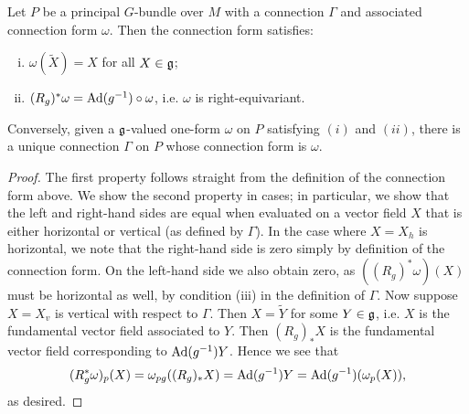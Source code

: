 \begin{thm}
Let $P$ be a principal $G$-bundle over $M$ with a connection $\Gamma$ and associated connection form $\omega$. Then the connection form satisfies:
\begin{enumerate}[(i)]
\item $\omega(\tilde X)=X$ for all $X\in\mathfrak g$;
\item $(R_g)^*\omega=\operatorname{Ad}(g^{-1})\circ \omega$, i.e. $\omega$ is right-equivariant.
\end{enumerate}

Conversely, given a $\mathfrak g$-valued one-form $\omega$ on $P$ satisfying $(i)$ and $(ii)$,
there is a unique connection $\Gamma$ on $P$ whose connection form is $\omega$.
\end{thm}
\begin{proof}
The first property follows straight from the definition of the connection form above.
We show the second property in cases; in particular, we show that the left and right-hand sides are equal when evaluated on a vector field $X$ that is either horizontal or vertical (as defined by $\Gamma$).
In the case where $X=X_h$ is horizontal, we note that the right-hand side is zero simply by definition of the connection form.
On the left-hand side we also obtain zero, as $((R_g)^*\omega)(X)$ must be horizontal as well, by condition (iii) in the definition of $\Gamma$.
Now suppose $X=X_v$ is vertical with respect to $\Gamma$. Then $X=\tilde Y$ for some $Y\in\mathfrak g$, i.e. $X$ is the fundamental vector field associated to $Y$.
Then $(R_g)_*X$ is the fundamental vector field corresponding to $\operatorname{Ad}(g^{-1})Y$.
 Hence we see that
\[(R_g^*\omega)_p(X)=\omega_{pg}((R_g)_*X)=\operatorname{Ad}(g^{-1})Y=\operatorname{Ad}(g^{-1})(\omega_p(X)),\]
as desired.


\end{proof}

